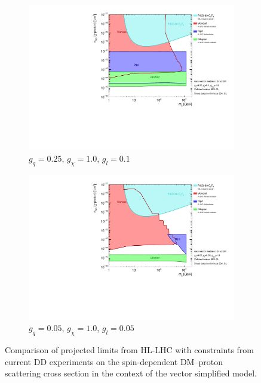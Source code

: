 \documentclass[11pt]{article}
\begin{document}
\begin{figure}
     \centering
     \begin{subfigure}[b]{0.8\textwidth}
         \centering
         \includegraphics[width=\textwidth]{SummaryPlots-EF10/figures/directdetection/hl-lhc/DD_Axial-vector_contour_monojet_gq0p25_gdm1p0_gl0p1_proton.pdf}
         \caption{$g_q=0.25$, $g_{\chi}=1.0$, $g_l=0.1$}
         \label{subfig:dd-hl-lhc-a1}
     \end{subfigure}

     \begin{subfigure}[b]{0.8\textwidth}
         \centering
         \includegraphics[width=\textwidth]{SummaryPlots-EF10/figures/directdetection/hl-lhc/DD_Axial-vector_contour_monojet_gq0p05_gdm1p0_gl0p05_proton.pdf}
         \caption{$g_q=0.05$, $g_{\chi}=1.0$, $g_l=0.05$}
         \label{subfig:dd-hl-lhc-new}
     \end{subfigure}
        \caption{Comparison of projected limits from HL-LHC with constraints from current DD experiments on the spin-dependent DM–proton scattering cross section in the context of the vector simplified model.}
        \label{fig:hl-lhc-dd-separate-sd}     
\end{figure}
     
\end{document}
